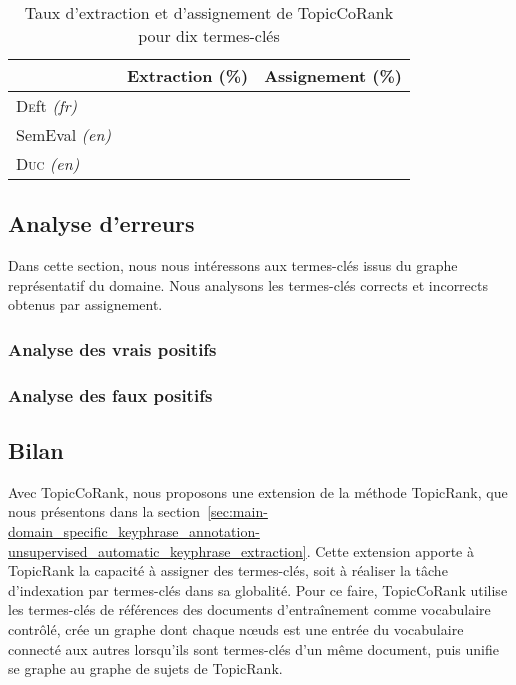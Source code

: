         \begin{table}[!h]
          \centering
          \begin{tabular}{l|c|c}
              \toprule
              & Extraction (\%) & Assignement (\%)\\
              \hline
              \textsc{De}ft \textit{(fr)} & & \\
              SemEval \textit{(en)} & & \\
              \textsc{Duc} \textit{(en)} & & \\
              \bottomrule
          \end{tabular}
          \caption{Taux d'extraction et d'assignement de TopicCoRank pour dix
                   termes-clés
                   \label{tab:assignment_ratio}}
        \end{table}

    \subsection{Analyse d'erreurs}
    \label{subsec:main-domain_specific_keyphrase_annotation-supervised_automatic_keyphrase_annotation-error_analysis}
      Dans cette section, nous nous intéressons aux termes-clés issus du graphe
      représentatif du domaine. Nous analysons les termes-clés corrects et
      incorrects obtenus par assignement.\TODO{\dots}

      \subsubsection{Analyse des vrais positifs}
      \label{subsec:main-domain_specific_keyphrase_annotation-supervised_automatic_keyphrase_annotation-error_analysis-true_positives}

      \subsubsection{Analyse des faux positifs}
      \label{subsec:main-domain_specific_keyphrase_annotation-supervised_automatic_keyphrase_annotation-error_analysis-false_positives}

    \subsection{Bilan}
    \label{subsec:main-domain_specific_keyphrase_annotation-supervised_automatic_keyphrase_annotation-conclusion}
      Avec TopicCoRank, nous proposons une extension de la méthode TopicRank,
      que nous présentons dans la
      section~\ref{sec:main-domain_specific_keyphrase_annotation-unsupervised_automatic_keyphrase_extraction}.
      Cette extension apporte à TopicRank la capacité à assigner des
      termes-clés, soit à réaliser la tâche d'indexation par termes-clés dans sa
      globalité. Pour ce faire, TopicCoRank utilise les termes-clés de
      références des documents d'entraînement comme vocabulaire contrôlé, crée
      un graphe dont chaque n\oe{}uds est une entrée du vocabulaire connecté aux
      autres lorsqu'ils sont termes-clés d'un même document, puis unifie se
      graphe au graphe de sujets de TopicRank.

